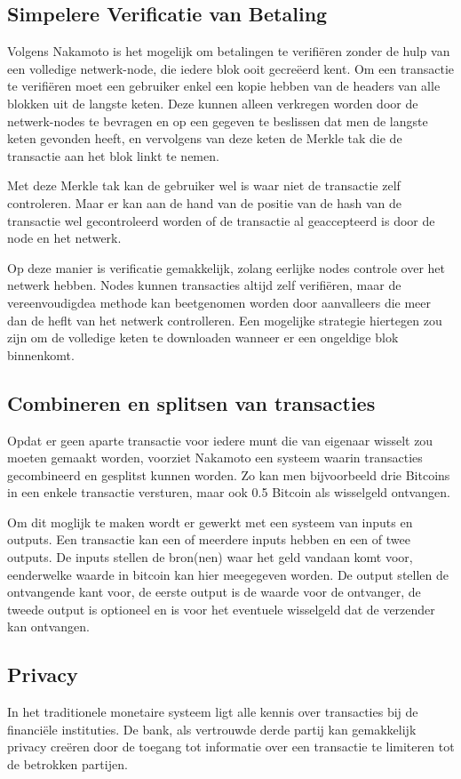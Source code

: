 	\subsection{Simpelere Verificatie van Betaling}
	Volgens Nakamoto is het mogelijk om betalingen te verifiëren zonder de hulp van een volledige netwerk-node, die iedere blok ooit gecreëerd kent. Om een transactie te verifiëren moet een gebruiker enkel een kopie hebben van de headers van alle blokken uit de langste keten. Deze kunnen alleen verkregen worden door de netwerk-nodes te bevragen en op een gegeven te beslissen dat men de langste keten gevonden heeft, en vervolgens van deze keten de Merkle tak die de transactie aan het blok linkt te nemen. 
	
	Met deze Merkle tak kan de gebruiker wel is waar niet de transactie zelf controleren. Maar er kan aan de hand van de positie van de hash van de transactie wel gecontroleerd worden of de transactie al geaccepteerd is door de node en het netwerk.
	
	Op deze manier is verificatie gemakkelijk, zolang eerlijke nodes controle over het netwerk hebben. Nodes kunnen transacties altijd zelf verifiëren, maar de vereenvoudigdea methode kan beetgenomen worden door aanvalleers die meer dan de heflt van het netwerk controlleren. Een mogelijke strategie hiertegen zou zijn om de volledige keten te downloaden wanneer er een ongeldige blok binnenkomt. 
	\subsection{Combineren en splitsen van transacties}
	Opdat er geen aparte transactie voor iedere munt die van eigenaar wisselt zou moeten gemaakt worden, voorziet Nakamoto een systeem waarin transacties gecombineerd en gesplitst kunnen worden. Zo kan men bijvoorbeeld drie Bitcoins in een enkele transactie versturen, maar ook 0.5 Bitcoin als wisselgeld ontvangen.
	
	Om dit moglijk te maken wordt er gewerkt met een systeem van inputs en outputs. Een transactie kan een of meerdere inputs hebben en een of twee outputs. De inputs stellen de bron(nen) waar het geld vandaan komt voor, eenderwelke waarde in bitcoin kan hier meegegeven worden. De output stellen de ontvangende kant voor, de eerste output is de waarde voor de ontvanger, de tweede output is optioneel en is voor het eventuele wisselgeld dat de verzender kan ontvangen.
	\subsection{Privacy}
	In het traditionele monetaire systeem ligt alle kennis over transacties bij de financiële instituties. De bank, als vertrouwde derde partij kan gemakkelijk privacy creëren door de toegang tot informatie over een transactie te limiteren tot de betrokken partijen. 
	

